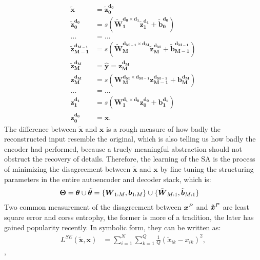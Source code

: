 \begin{equation} \label{eq:ED}
\begin{split}
  \boldsymbol{\tilde{x}}                 &= \boldsymbol{\tilde{z}_{0  }^{d_{0  }}} \\
  \boldsymbol{\tilde{z}_{0  }^{d_{0  }}} &= s(\boldsymbol{\tilde{W}_{1  }^{d_{0  } \times d_{1  }} \tilde{z}_{1  }^{d_{1  }}}+\boldsymbol{\tilde{b}_{0  }^{d_{0  }}}) \\
  ... &= ... \\
  \boldsymbol{\tilde{z}_{M-1}^{d_{M-1}}} &= s(\boldsymbol{\tilde{W}_{M  }^{d_{M-1} \times d_{M  }} \tilde{z}_{M  }^{d_{M  }}}+\boldsymbol{\tilde{b}_{M-1}^{d_{M-1}}}) \\
  \boldsymbol{\tilde{z}_{M  }^{d_{M  }}} &= \boldsymbol{\hat{y}} = \boldsymbol{z_{M  }^{d_{M  }}} \\
  \boldsymbol{z_{M  }^{d_{M  }}}         &= s(\boldsymbol{W_{M  }^{d_{M  } \times d_{M-1}} z_{M-1}^{d_{M-1}}}+\boldsymbol{b_{M  }^{d_{M  }}}) \\
  ... &= ... \\
  \boldsymbol{z_{1  }^{d_{1  }}}         &= s(\boldsymbol{W_{1  }^{d_{1  } \times d_{0  }} z_{0  }^{d_{0  }}}+\boldsymbol{b_{1  }^{d_{1  }}}) \\
  \boldsymbol{z_{0  }^{d_{0  }}}         &= \boldsymbol{x}.
\end{split}
\end{equation}
The difference between $\boldsymbol{\tilde{x}}$ and $\boldsymbol{x}$ is a rough measure of how badly the reconstructed input resemble the original, which is also telling us how badly the encoder had performed, because a truely meaningful abstraction should not obstruct the recovery of details. Therefore, the learning of the SA is the process of minimizing the disagreement between $\boldsymbol{\tilde{x}}$ and $\boldsymbol{x}$ by fine tuning the structuring parameters in the entire autoencoder and decoder stack, which is:
\begin{equation} \label{eq:PAR}
\begin{split}
  \boldsymbol{\Theta} &= \boldsymbol{\theta} \cup \boldsymbol{\tilde{\theta}} = \{\boldsymbol{W}_{1:M}, \boldsymbol{b}_{1:M}\} \cup \{\boldsymbol{\tilde{W}}_{M:1}, \boldsymbol{\tilde{b}}_{M:1}\}
\end{split}
\end{equation}
Two common measurement of the disagreement between $\boldsymbol{x}^P$ and $\boldsymbol{\tilde{x}}^P$ are least square error and corss entrophy, the former is more of a tradition, the later has gained popularity recently. In symbolic form, they can be written as:
\begin{equation} \label{eq:SE}
\begin{split}
  L^{SE}(\boldsymbol{\tilde{x}},\boldsymbol{x}) &= \sum_{i=1}^N\sum_{k=1}^Q\frac{1}{Q}(\tilde{x}_{ik}-x_{ik})^2,
\end{split}
\end{equation},
